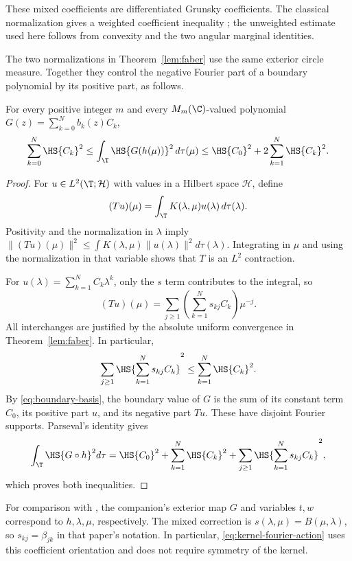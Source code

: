 These mixed coefficients are differentiated Grunsky coefficients.
The classical normalization gives a weighted coefficient inequality
\cite[equations~(1.1)--(1.3)]{BeckermannStylianopoulos2018};
the unweighted estimate used here follows from convexity and the two
angular marginal identities.

The two normalizations in Theorem~\ref{lem:faber} use the same exterior circle measure. Together they control the negative Fourier part of a boundary polynomial by its positive part, as follows.

\begin{proposition}\label{prop:coefficients}
For every positive integer $m$ and every $M_m(\C)$-valued polynomial $G(z)=\sum_{k=0}^N b_k(z)C_k$,
\begin{equation}\label{eq:coefficient-estimate}
 \sum_{k=0}^N\HS{C_k}^2
 \le\int_\T\HS{G(h(\mu))}^2\,d\tau(\mu)
 \le\HS{C_0}^2+2\sum_{k=1}^N\HS{C_k}^2.
\end{equation}
\end{proposition}
\begin{proof}
For $u\in L^2(\T;\mathcal H)$ with values in a Hilbert space $\mathcal H$, define
\[
 (Tu)(\mu)=\int_\T K(\lambda,\mu)u(\lambda)\,d\tau(\lambda).
\]
Positivity and the normalization in $\lambda$ imply
$\|(Tu)(\mu)\|^2\le\int K(\lambda,\mu)\|u(\lambda)\|^2d\tau(\lambda)$.
Integrating in $\mu$ and using the normalization in that variable shows that $T$ is an $L^2$ contraction.

For $u(\lambda)=\sum_{k=1}^N C_k\lambda^k$, only the $s$ term contributes to the integral, so
\begin{equation}\label{eq:kernel-fourier-action}
 (Tu)(\mu)=\sum_{j\ge1}\left(\sum_{k=1}^Ns_{kj}C_k\right)\mu^{-j}.
\end{equation}
All interchanges are justified by the absolute uniform convergence in Theorem~\ref{lem:faber}. In particular,
\[
 \sum_{j\ge1}\HS{\sum_{k=1}^Ns_{kj}C_k}^2\le\sum_{k=1}^N\HS{C_k}^2.
\]
By \eqref{eq:boundary-basis}, the boundary value of $G$ is the sum of its constant term $C_0$, its positive part $u$, and its negative part $Tu$. These have disjoint Fourier supports. Parseval's identity gives
\[
 \int_\T\HS{G\circ h}^2d\tau
 =\HS{C_0}^2+\sum_{k=1}^N\HS{C_k}^2+
   \sum_{j\ge1}\HS{\sum_{k=1}^Ns_{kj}C_k}^2,
\]
which proves both inequalities.
\end{proof}
For comparison with \cite[Proposition~3.1]{OpenAI2026Complete}, the
companion's exterior map $G$ and variables $t,w$ correspond to
$h,\lambda,\mu$, respectively.
The mixed correction is $s(\lambda,\mu)=B(\mu,\lambda)$, so
$s_{kj}=\beta_{jk}$ in that paper's notation. In particular,
\eqref{eq:kernel-fourier-action} uses this coefficient orientation and
does not require symmetry of the kernel.
